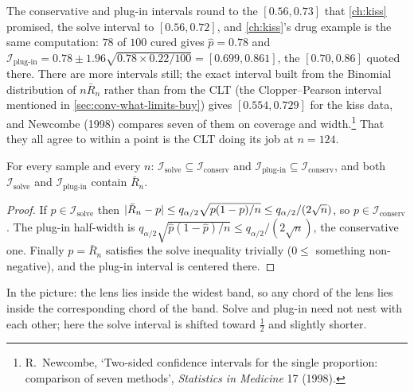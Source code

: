 The conservative and plug-in intervals round to the $[0.56, 0.73]$ that \cref{ch:kiss} promised, the solve interval to $[0.56, 0.72]$, and \cref{ch:kiss}'s drug example is the same computation: $78$ of $100$ cured gives $\hat{p} = 0.78$ and $\mathcal{I}_{\text{plug-in}} = 0.78 \pm 1.96\sqrt{0.78 \times 0.22/100} = [0.699, 0.861]$, the $[0.70, 0.86]$ quoted there.
There are more intervals still; the exact interval built from the Binomial distribution of $n\bar{R}_n$ rather than from the CLT (the Clopper--Pearson interval mentioned in \cref{sec:conv-what-limits-buy}) gives $[0.554, 0.729]$ for the kiss data, and Newcombe (1998) compares seven of them on coverage and width.\footnote{R.\ Newcombe, `Two-sided confidence intervals for the single proportion: comparison of seven methods', \textit{Statistics in Medicine} 17 (1998).}
That they all agree to within a point is the CLT doing its job at $n = 124$.

\begin{proposition}
\label{prop:ci-nesting}
For every sample and every $n$: $\mathcal{I}_{\text{solve}} \subseteq \mathcal{I}_{\text{conserv}}$ and $\mathcal{I}_{\text{plug-in}} \subseteq \mathcal{I}_{\text{conserv}}$, and both $\mathcal{I}_{\text{solve}}$ and $\mathcal{I}_{\text{plug-in}}$ contain $\bar{R}_n$.
\end{proposition}
\begin{proof}
If $p \in \mathcal{I}_{\text{solve}}$ then $\lvert\bar{R}_n - p\rvert \leq q_{\alpha/2}\sqrt{p(1-p)/n} \leq q_{\alpha/2}/(2\sqrt{n})$, so $p \in \mathcal{I}_{\text{conserv}}$.
The plug-in half-width is $q_{\alpha/2}\sqrt{\hat{p}(1-\hat{p})/n} \leq q_{\alpha/2}/(2\sqrt{n})$, the conservative one.
Finally $p = \bar{R}_n$ satisfies the solve inequality trivially ($0 \leq$ something non-negative), and the plug-in interval is centered there.
\end{proof}

In the picture: the lens lies inside the widest band, so any chord of the lens lies inside the corresponding chord of the band.
Solve and plug-in need not nest with each other; here the solve interval is shifted toward $\frac12$ and slightly shorter.


